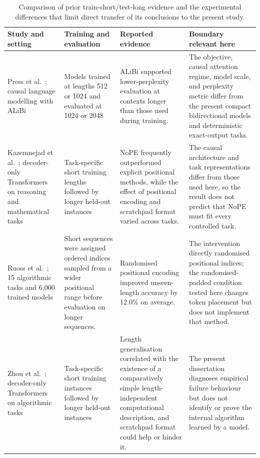 \documentclass[
    author={Aanchala Ravindra Bhongade},
    supervisor={Dr. Fernando Moreno-Pino},
    degree={MSc},
    title={Length Generalisation in Transformer-Based Sequence Models: Failure Taxonomy and Mitigation Strategies},
    subtitle={},
    type={},
    year={2026}
]{dissertation}
\begin{document}
\begin{table}[tbp]
\centering
\scriptsize
\setlength{\tabcolsep}{3.5pt}
\renewcommand{\arraystretch}{1.12}
\begin{tabular}{
p{}
p{}
p{}
p{}
}
\hline
\textbf{Study and setting} &
\textbf{Training and evaluation} &
\textbf{Reported evidence} &
\textbf{Boundary relevant here} \\
\hline

Press et al.~\cite{press2022train};
causal language modelling with ALiBi &
Models trained at lengths 512 or 1024 and evaluated at 1024 or 2048 &
ALiBi supported lower-perplexity evaluation at contexts longer than those used during training. &
The objective, causal attention regime, model scale, and perplexity metric differ from the present compact bidirectional models and deterministic exact-output tasks. \\

Kazemnejad et al.~\cite{kazemnejad2023impact};
decoder-only Transformers on reasoning and mathematical tasks &
Task-specific short training lengths followed by longer held-out instances &
NoPE frequently outperformed explicit positional methods, while the effect of positional encoding and scratchpad format varied across tasks. &
The causal architecture and task representations differ from those used here, so the result does not predict that NoPE must fit every controlled task. \\

Ruoss et al.~\cite{ruoss2023randomized};
15 algorithmic tasks and 6,000 trained models &
Short sequences were assigned ordered indices sampled from a wider
positional range before evaluation on longer sequences. &
Randomised positional encoding improved unseen-length accuracy by 12.0\% on average. &
The intervention directly randomised positional indices; the
randomised-padded condition tested here changes token placement but does not implement that method. \\

Zhou et al.~\cite{zhou2024algorithms};
decoder-only Transformers on algorithmic tasks &
Task-specific short training instances followed by longer held-out
instances &
Length generalisation correlated with the existence of a comparatively simple length-independent computational description, and scratchpad format could help or hinder it. &
The present dissertation diagnoses empirical failure behaviour but does not identify or prove the internal algorithm learned by a model. \\
\hline
\end{tabular}
\caption{Comparison of prior train-short/test-long evidence and the
experimental differences that limit direct transfer of its conclusions to the present study.}
\label{tab:prior_length_studies}
\end{table}
\end{document}
